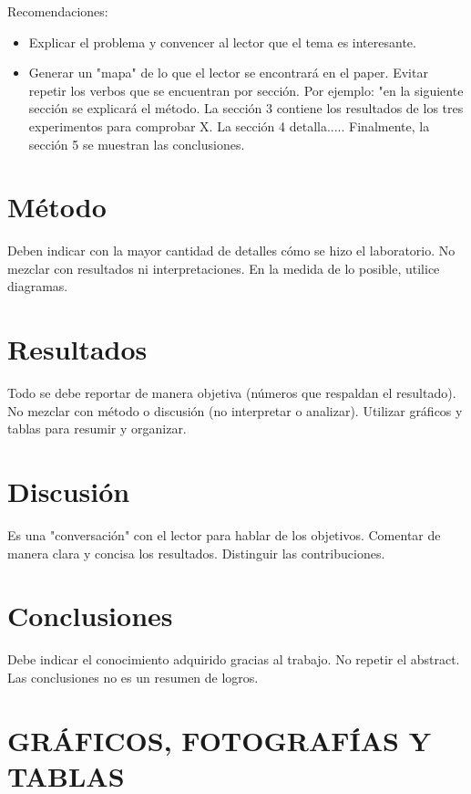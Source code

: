 \documentclass[journal,onecolumn]{IEEEtran}
\begin{document}
Recomendaciones:

\begin{itemize}
    \item Explicar el problema y convencer al lector que el tema es interesante.
    \item Generar un "mapa" de lo que el lector se encontrará en el paper. Evitar repetir los verbos que se encuentran por sección. Por ejemplo: "en la siguiente sección se explicará el método. La sección 3 contiene los resultados de los tres experimentos para comprobar X. La sección 4 detalla..... Finalmente, la sección 5 se muestran las conclusiones.
\end{itemize}

\section{Método}

Deben indicar con la mayor cantidad de detalles cómo se hizo el laboratorio. No mezclar con resultados ni interpretaciones. En la medida de lo posible, utilice diagramas.

\section{Resultados}

Todo se debe reportar de manera objetiva (números que respaldan el resultado). No mezclar con método o discusión (no interpretar o analizar). Utilizar gráficos y tablas para resumir y organizar. 

\section{Discusión}

Es una "conversación" con el lector para hablar de los objetivos. Comentar de manera clara y concisa los resultados. Distinguir las contribuciones. 

\section{Conclusiones}

Debe indicar el conocimiento adquirido gracias al trabajo. No repetir el abstract. Las conclusiones no es un resumen de logros.



\section{GRÁFICOS, FOTOGRAFÍAS Y TABLAS}
\end{document}
